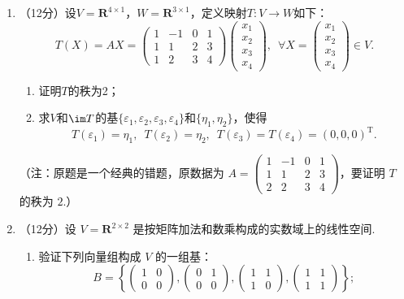 \begin{enumerate}
\begin{enumerate}
        \item 求$f(x,y,z)$的正惯性指数和负惯性指数.
    \end{enumerate}

    \item （12分）设$V=\mathbf{R}^{4\times 1}$，$W=\mathbf{R}^{3\times 1}$，定义映射$T\colon V\to W$如下：
    \[T(X)=AX=\begin{pmatrix}
        1 & -1 & 0 & 1 \\ 1 & 1 & 2 & 3 \\ 1 & 2 & 3 & 4
    \end{pmatrix}\begin{pmatrix}
        x_1 \\ x_2 \\ x_3 \\ x_4
    \end{pmatrix},\enspace\forall X=\begin{pmatrix}
        x_1 \\ x_2 \\ x_3 \\ x_4
    \end{pmatrix}\in V.\]
    \begin{enumerate}
        \item 证明$T$的秩为2；

        \item 求$V$和$\im T$的基$\{\varepsilon_1,\varepsilon_2,\varepsilon_3,\varepsilon_4\}$和$\{\eta_1,\eta_2\}$，使得
        \[T(\varepsilon_1)=\eta_1,\enspace T(\varepsilon_2)=\eta_2,\enspace T(\varepsilon_3)=T(\varepsilon_4)=(0,0,0)^\mathrm{T}.\]
    \end{enumerate}
    （注：原题是一个经典的错题，原数据为 $A=\begin{pmatrix}
        1 & -1 & 0 & 1 \\ 1 & 1 & 2 & 3 \\ 2 & 2 & 3 & 4
    \end{pmatrix}$，要证明 $T$ 的秩为 $2$.）

    \item （12分）设 $V=\mathbf{R}^{2 \times 2}$ 是按矩阵加法和数乘构成的实数域上的线性空间.
    \begin{enumerate}
        \item 验证下列向量组构成 $V$ 的一组基：
        \[B=\left\{\begin{pmatrix}
        1 & 0 \\ 0 & 0 \end{pmatrix},\begin{pmatrix}
        0 & 1 \\ 0 & 0 \end{pmatrix},\begin{pmatrix}
        1 & 1 \\ 1 & 0 \end{pmatrix},\begin{pmatrix}
        1 & 1 \\ 1 & 1 \end{pmatrix}\right\};\]


\end{enumerate}
\end{enumerate}

